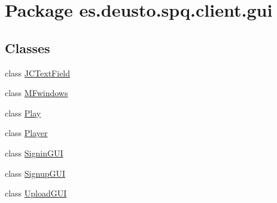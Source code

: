 \hypertarget{namespacees_1_1deusto_1_1spq_1_1client_1_1gui}{}\section{Package es.\+deusto.\+spq.\+client.\+gui}
\label{namespacees_1_1deusto_1_1spq_1_1client_1_1gui}
\subsection*{Classes}
\begin{DoxyCompactItemize}
\item 
class \hyperlink{classes_1_1deusto_1_1spq_1_1client_1_1gui_1_1_j_c_text_field}{J\+C\+Text\+Field}
\item 
class \hyperlink{classes_1_1deusto_1_1spq_1_1client_1_1gui_1_1_m_fwindows}{M\+Fwindows}
\item 
class \hyperlink{classes_1_1deusto_1_1spq_1_1client_1_1gui_1_1_play}{Play}
\item 
class \hyperlink{classes_1_1deusto_1_1spq_1_1client_1_1gui_1_1_player}{Player}
\item 
class \hyperlink{classes_1_1deusto_1_1spq_1_1client_1_1gui_1_1_signin_g_u_i}{Signin\+G\+UI}
\item 
class \hyperlink{classes_1_1deusto_1_1spq_1_1client_1_1gui_1_1_signup_g_u_i}{Signup\+G\+UI}
\item 
class \hyperlink{classes_1_1deusto_1_1spq_1_1client_1_1gui_1_1_upload_g_u_i}{Upload\+G\+UI}
\end{DoxyCompactItemize}
